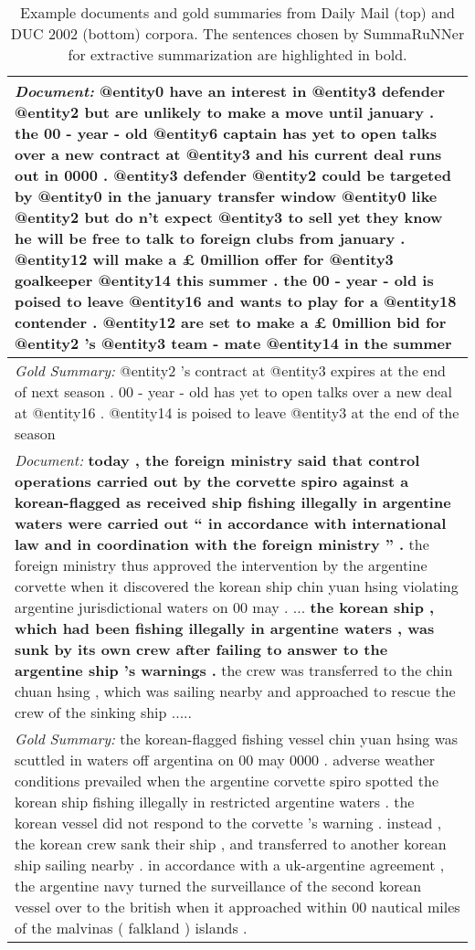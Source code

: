 \documentclass[letterpaper]{article}
\begin{document}
\begin{table}
\centering
{\small
\begin{tabular}{|p{8.5cm}|}
\hline
{\it Document:}  {\bf @entity0 have an interest in @entity3 defender @entity2 but are unlikely to make a move until january} .  {\bf the 00 - year - old @entity6 captain has yet to open talks over a new contract at @entity3 and his current deal runs out in 0000 .}  @entity3 defender @entity2 could be targeted by @entity0 in the january transfer window @entity0 like @entity2 but do n't expect @entity3 to sell yet they know he will be free to talk to foreign clubs from january .  @entity12 will make a £ 0million offer for @entity3 goalkeeper @entity14 this summer . the 00 - year - old is poised to leave @entity16 and wants to play for a @entity18 contender . {\bf @entity12 are set to make a £ 0million bid for @entity2 's @entity3 team - mate @entity14 in the summer }   \\
\hline
{\it Gold Summary:} @entity2 's contract at @entity3 expires at the end of next season . 00 - year - old has yet to open talks over a new deal at @entity16 . @entity14 is poised to leave @entity3 at the end of the season \\
\hline
\hline
{\it Document:} {\bf today , the foreign ministry said that control operations carried out by the corvette spiro against a korean-flagged as received ship fishing illegally in argentine waters were carried out `` in accordance with international law and in coordination with the foreign ministry '' .} the foreign ministry thus approved the intervention by the argentine corvette when it discovered the korean ship chin yuan hsing violating argentine jurisdictional waters on 00 may . ...  {\bf the korean ship , which had been fishing illegally in argentine waters , was sunk by its own crew after failing to answer to the argentine ship 's warnings .} the crew was transferred to the chin chuan hsing , which was sailing nearby and approached to rescue the crew of the sinking ship .....\\
\hline
{\it Gold Summary:} the korean-flagged fishing vessel chin yuan hsing was scuttled in waters off argentina on 00 may 0000 . adverse weather conditions prevailed when the argentine corvette spiro spotted the korean ship fishing illegally in restricted argentine waters . the korean vessel did not respond to the corvette 's warning . instead , the korean crew sank their ship , and transferred to another korean ship sailing nearby . in accordance with a uk-argentine agreement , the argentine navy turned the surveillance of the second korean vessel over to the british when it approached within 00 nautical miles of the malvinas ( falkland ) islands . \\
\hline
\end{tabular}
}
\caption{{\small Example documents and gold summaries from Daily Mail (top) and DUC 2002 (bottom) corpora. The sentences chosen by SummaRuNNer for extractive summarization are highlighted in bold.}}
\label{tab:example_summaries}
\end{table}





\end{document}
